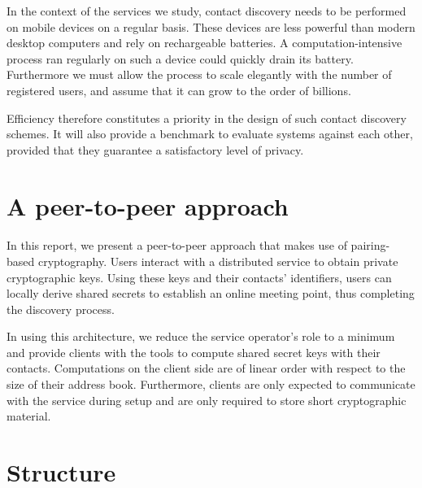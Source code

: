 In the context of the services we study, contact discovery needs to be performed on mobile devices on a regular basis. These devices are less powerful than modern desktop computers and rely on rechargeable batteries. A computation-intensive process ran regularly on such a device could quickly drain its battery. Furthermore we must allow the process to scale elegantly with the number of registered users, and assume that it can grow to the order of billions.

Efficiency therefore constitutes a priority in the design of such contact discovery schemes. It will also provide a benchmark to evaluate systems against each other, provided that they guarantee a satisfactory level of privacy.




%


\section{A peer-to-peer approach}

\paragraph{} In this report, we present a peer-to-peer approach that makes use of pairing-based cryptography. Users interact with a distributed service to obtain private cryptographic keys. Using these keys and their contacts' identifiers, users can locally derive shared secrets to establish an online meeting point, thus completing the discovery process.


In using this architecture, we reduce the service operator's role to a minimum and provide clients with the tools to compute shared secret keys with their contacts. Computations on the client side are of linear order with respect to the size of their address book. Furthermore, clients are only expected to communicate with the service during setup and are only required to store short cryptographic material.



\section{Structure}




























